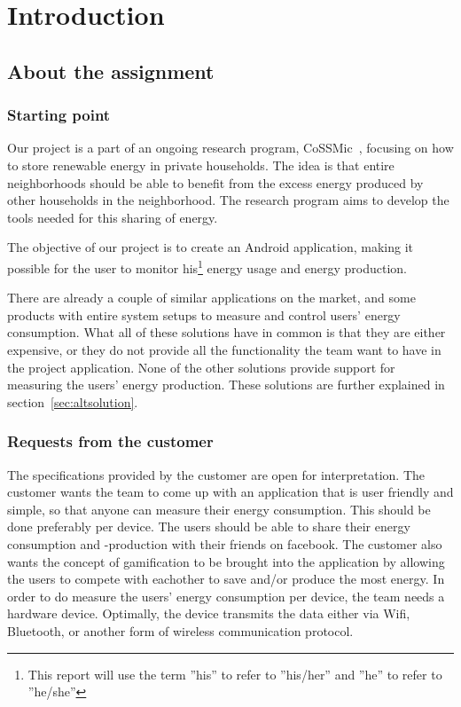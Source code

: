 \chapter{Introduction}

\section{About the assignment}
\subsection{Starting point}
Our project is a part of an ongoing research program, CoSSMic~\cite{cossmic}, focusing on how to store renewable energy in private households. The idea is that entire neighborhoods should be able to benefit from the excess energy produced by other households in the neighborhood. The research program aims to develop the tools needed for this sharing of energy. 

The objective of our project is to create an Android application, making it possible for the user to monitor his\footnote{This report will use the term ''his'' to refer to ''his/her'' and ''he'' to refer to ''he/she''} energy usage and energy production. 

There are already a couple of similar applications on the market, and some products with entire system setups to measure and control users' energy consumption. What all of these solutions have in common is that they are either expensive, or they do not provide all the functionality the team want to have in the project application. None of the other solutions provide support for measuring the users' energy production. These solutions are further explained in section~\ref{sec:altsolution}.

\subsection{Requests from the customer}
The specifications provided by the customer are open for interpretation. The customer wants the team to come up with an application that is user friendly and simple, so that anyone can measure their energy consumption. This should be done preferably per device. The users should be able to share their energy consumption and -production with their friends on \gls{facebook}. The customer also wants the concept of \gls{gamification} to be brought into the application by allowing the users to compete with eachother to save and/or produce the most energy. In order to do measure the users' energy consumption per device, the team needs a hardware device. Optimally, the device transmits the data either via Wifi, Bluetooth, or another form of wireless communication protocol. 


